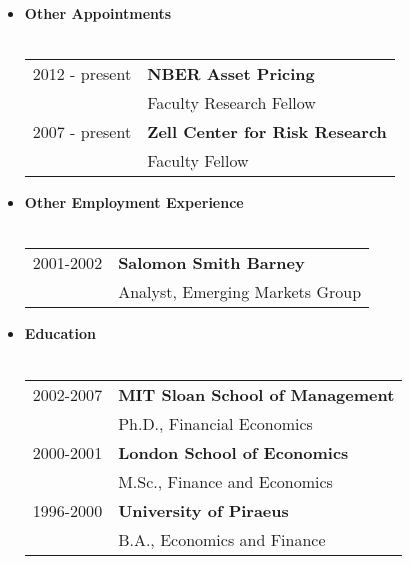 \documentclass[11pt,a4paper,sans]{moderncv}
\begin{document}
\begin{resume}
\begin{itemize}
\item \textbf{Other Appointments}\\
\\
\begin{tabular}{ll}
2012 - present & \textbf{NBER Asset Pricing}\\
& Faculty Research Fellow\\[0.2cm]
2007 - present & \textbf{Zell Center for Risk Research}\\
& Faculty Fellow  \\[0.2cm]
\end{tabular}
\vspace{0.6cm}
\item \textbf{Other Employment Experience}\\\\
\begin{tabular}{ll}
2001-2002 & \textbf{Salomon Smith Barney}\\
& Analyst, Emerging Markets Group\\[0.2cm]
\end{tabular}
\vspace{0.6cm}

\item \textbf{Education}\\
\\
\begin{tabular}{ll}
2002-2007 & \textbf{MIT Sloan School of Management}\\
& Ph.D., Financial Economics\\[0.2cm]
2000-2001 & \textbf{London School of Economics}\\
& M.Sc., Finance and Economics \\[0.2cm]
1996-2000 & \textbf{University of Piraeus} \\
& B.A., Economics and Finance\\[0.2cm]
\end{tabular}

\newpage


\end{itemize}
\end{resume}
\end{document}
